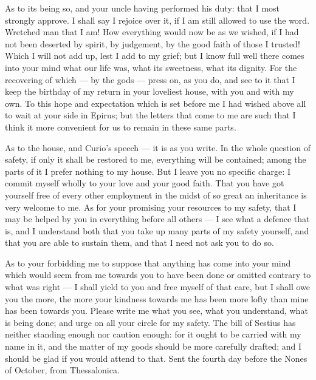 

 As to its being so, and your uncle having performed his duty: that I most strongly approve. I shall say I rejoice over it, if I am still allowed to use the word. Wretched man that I am! How everything would now be as we wished, if I had not been deserted by spirit, by judgement, by the good faith of those I trusted! Which I will not add up, lest I add to my grief; but I know full well there comes into your mind what our life was, what its sweetness, what its dignity. For the recovering of which --- by the gods --- press on, as you do, and see to it that I keep the birthday of my return in your loveliest house, with you and with my own. To this hope and expectation which is set before me I had wished above all to wait at your side in Epirus; but the letters that come to me are such that I think it more convenient for us to remain in these same parts.

 As to the house, and Curio's speech --- it is as you write. In the whole question of safety, if only it shall be restored to me, everything will be contained; among the parts of it I prefer nothing to my house. But I leave you no specific charge: I commit myself wholly to your love and your good faith. That you have got yourself free of every other employment in the midst of so great an inheritance is very welcome to me. As for your promising your resources to my safety, that I may be helped by you in everything before all others --- I see what a defence that is, and I understand both that you take up many parts of my safety yourself, and that you are able to sustain them, and that I need not ask you to do so.

 As to your forbidding me to suppose that anything has come into your mind which would seem from me towards you to have been done or omitted contrary to what was right --- I shall yield to you and free myself of that care, but I shall owe you the more, the more your kindness towards me has been more lofty than mine has been towards you. Please write me what you see, what you understand, what is being done; and urge on all your circle for my safety. The bill of Sestius has neither standing enough nor caution enough: for it ought to be carried with my name in it, and the matter of my goods should be more carefully drafted; and I should be glad if you would attend to that. Sent the fourth day before the Nones of October, from Thessalonica.
